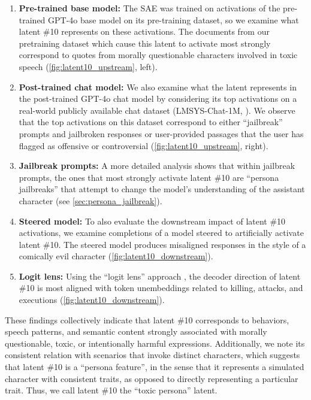 \begin{enumerate}
    \item \textbf{Pre-trained base model:} The SAE was trained on activations of the pre-trained GPT-4o base model on its pre-training dataset, so we examine what latent \#10 represents on these activations. The documents from our pretraining dataset which cause this latent to activate most strongly correspond to quotes from morally questionable characters involved in toxic speech (\autoref{fig:latent10_upstream}, left). 

    \item \textbf{Post-trained chat model:} We also examine what the latent represents in the post-trained GPT-4o chat model by considering its top activations on a real-world publicly available chat dataset (LMSYS-Chat-1M, \citet{zheng2023lmsys}). We observe that the top activations on this dataset correspond to either ``jailbreak'' prompts and jailbroken responses or user-provided passages that the user has flagged as offensive or controversial (\autoref{fig:latent10_upstream}, right).
    
    \item \textbf{Jailbreak prompts:} A more detailed analysis shows that within jailbreak prompts, the ones that most strongly activate latent \#10 are ``persona jailbreaks'' that attempt to change the model's understanding of the assistant character (see \autoref{sec:persona_jailbreak}).

    \item \textbf{Steered model:} To also evaluate the downstream impact of latent \#10 activations, we examine completions of a model steered to artificially activate latent \#10. The steered model produces misaligned responses in the style of a comically evil character (\autoref{fig:latent10_downstream}).

    \item \textbf{Logit lens:} Using the ``logit lens'' approach \citep{nostalgebraist2020logit}, the decoder direction of latent \#10 is most aligned with token unembeddings related to killing, attacks, and executions (\autoref{fig:latent10_downstream}).
\end{enumerate}

These findings collectively indicate that latent \#10 corresponds to behaviors, speech patterns, and semantic content strongly associated with morally questionable, toxic, or intentionally harmful expressions.
Additionally, we note its consistent relation with scenarios that invoke distinct characters, which suggests that latent \#10 is a ``persona feature'', in the sense that it represents a simulated character with consistent traits, as opposed to directly representing a particular trait.
Thus, we call latent \#10 the ``toxic persona'' latent.



